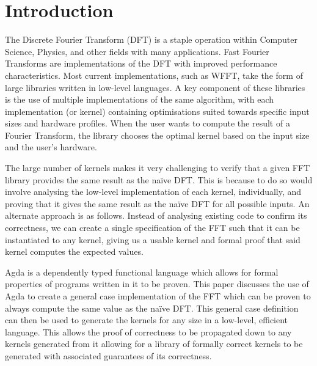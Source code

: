 \section{Introduction}

The Discrete Fourier Transform (DFT) is a staple operation within Computer Science, Physics, and other fields with many applications.
Fast Fourier Transforms are implementations of the DFT with improved performance characteristics.
Most current implementations, such as WFFT\cite{Frigo2005}, take the form of large libraries written in low-level languages. 
A key component of these libraries is the use of multiple implementations of the same algorithm, with each implementation (or kernel) containing optimisations suited towards specific input sizes and hardware profiles. 
When the user wants to compute the result of a Fourier Transform, the library chooses the optimal kernel based on the input size and the user's hardware.

The large number of kernels makes it very challenging to verify that a given FFT library provides the same result as the naïve DFT.
This is because to do so would involve analysing the low-level implementation of each kernel, individually, and proving that it gives the same result as the naïve DFT for all possible inputs.
An alternate approach is as follows. %
Instead of analysing existing code to confirm its correctness, we can create a single specification of the FFT such that it can be instantiated to any kernel, giving us a usable kernel and formal proof that said kernel computes the expected values.

Agda is a dependently typed functional language which allows for formal properties of programs written in it to be proven.\cite{Norell2007} 
This paper discusses the use of Agda to create a general case implementation of the FFT which can be proven to always compute the same value as the naïve DFT.
This general case definition can then be used to generate the kernels for any size in a low-level, efficient language.
This allows the proof of correctness to be propagated down to any kernels generated from it allowing for a library of formally correct kernels to be generated with associated guarantees of its correctness.

